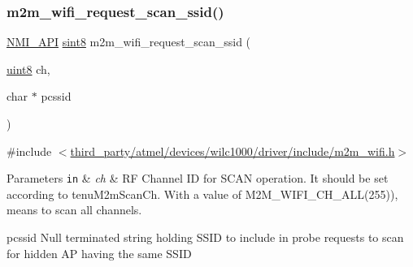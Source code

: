 \subsubsection{\texorpdfstring{m2m\+\_\+wifi\+\_\+request\+\_\+scan\+\_\+ssid()}{m2m\_wifi\_request\_scan\_ssid()}}
{\footnotesize\ttfamily \hyperlink{group__BSPDefine_gaecc0323d771e41ef81a76b5f12783e22}{N\+M\+I\+\_\+\+A\+PI} \hyperlink{group__DataT_gae35f10ffd0ac8dd2bc3e794da9bdfbc7}{sint8} m2m\+\_\+wifi\+\_\+request\+\_\+scan\+\_\+ssid (\begin{DoxyParamCaption}\item[{\hyperlink{group__DataT_ga4df709a77647e870bbf1d955b8edc9a6}{uint8}}]{ch,  }\item[{char $\ast$}]{pcssid }\end{DoxyParamCaption})}



{\ttfamily \#include $<$\hyperlink{m2m__wifi_8h}{third\+\_\+party/atmel/devices/wilc1000/driver/include/m2m\+\_\+wifi.\+h}$>$}


\begin{DoxyParams}[1]{Parameters}
\mbox{\tt in}  & {\em ch} & RF Channel ID for S\+C\+AN operation. It should be set according to tenu\+M2m\+Scan\+Ch. With a value of M2\+M\+\_\+\+W\+I\+F\+I\+\_\+\+C\+H\+\_\+\+A\+L\+L(255)), means to scan all channels.\\
\hline
\end{DoxyParams}
pcssid Null terminated string holding S\+S\+ID to include in probe requests to scan for hidden AP having the same S\+S\+ID

